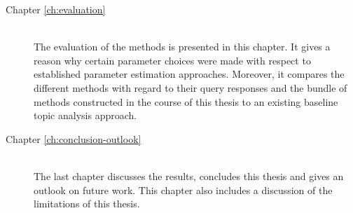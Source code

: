 \begin{description}
    \item[Chapter \ref{ch:evaluation}] \hfill \\
        The evaluation of the methods is presented in this chapter.
        It gives a reason why certain parameter choices were made 
        with respect to established parameter estimation approaches.
        Moreover, it compares the different methods with regard to their query responses 
        and the bundle of methods constructed in the course of this thesis to an existing baseline topic analysis approach.

    \item[Chapter \ref{ch:conclusion-outlook}] \hfill \\
        The last chapter discusses the results, concludes this thesis and gives an outlook on future work.
        This chapter also includes a discussion of the limitations of this thesis.

\end{description}